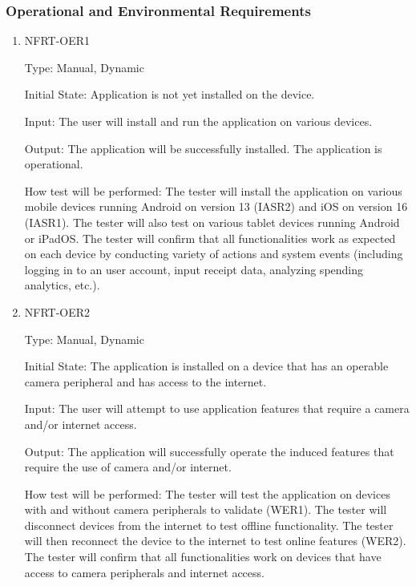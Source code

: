 \documentclass[12pt, titlepage]{article}
\begin{document}
\subsubsection{Operational and Environmental Requirements}

\begin{enumerate}
\item{NFRT-OER1\\}

Type: Manual, Dynamic

Initial State: Application is not yet installed on the device.
                
Input: The user will install and run the application on various devices.
                
Output: The application will be successfully installed. The application is operational.
                
How test will be performed: The tester will install the application on various mobile devices running Android on version 13 (IASR2) and iOS on version 16 (IASR1). The tester will also test on various tablet devices running Android or iPadOS. The tester will confirm that all functionalities work as expected on each device by conducting variety of actions and system events (including logging in to an user account, input receipt data, analyzing spending analytics, etc.).

\item{NFRT-OER2\\}

Type: Manual, Dynamic

Initial State: The application is installed on a device that has an operable camera peripheral and has access to the internet.
                
Input: The user will attempt to use application features that require a camera and/or internet access.
                
Output: The application will successfully operate the induced features that require the use of camera and/or internet.
                
How test will be performed: The tester will test the application on devices with and without camera peripherals to validate (WER1). The tester will disconnect devices from the internet to test offline functionality. The tester will then reconnect the device to the internet to test online features (WER2). The tester will confirm that all functionalities work on devices that have access to camera peripherals and internet access.


\end{enumerate}
\end{document}
